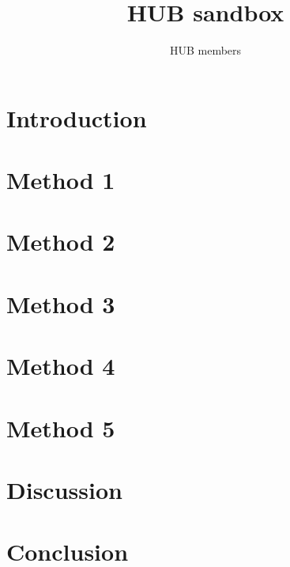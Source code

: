 \documentclass{article}
\begin{document}
\title{HUB sandbox}
\author{HUB members}

\maketitle

\begin{abstract}

\end{abstract}

\section{Introduction}


\section{Method 1}


\section{Method 2}


\section{Method 3}


\section{Method 4}


\section{Method 5}


\section{Discussion}


\section{Conclusion}

\end{document}
